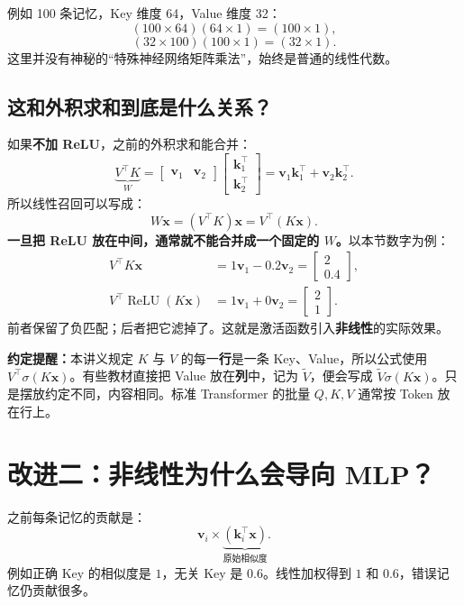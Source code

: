 \documentclass[11pt,a4paper,UTF8]{ctexart}
\numberwithin{equation}{section}
\newcommand{\vect}[1]{\boldsymbol{#1}}
\newcommand{\relu}{\operatorname{ReLU}}
\begin{document}
例如 100 条记忆，Key 维度 64，Value 维度 32：
\[
(100\times64)(64\times1)=(100\times1),
\]
\[
(32\times100)(100\times1)=(32\times1).
\]
这里并没有神秘的“特殊神经网络矩阵乘法”，始终是普通的线性代数。

\subsection{这和外积求和到底是什么关系？}

如果\textbf{不加 ReLU}，之前的外积求和能合并：
\begin{equation}
\underbrace{V^\top K}_{W}
=
\begin{bmatrix}\vect{v}_1&\vect{v}_2\end{bmatrix}
\begin{bmatrix}\vect{k}_1^\top\\\vect{k}_2^\top\end{bmatrix}
=
\vect{v}_1\vect{k}_1^\top+\vect{v}_2\vect{k}_2^\top.
\end{equation}
所以线性召回可以写成：
\[
W\vect{x}=(V^\top K)\vect{x}=V^\top(K\vect{x}).
\]
\textbf{一旦把 ReLU 放在中间，通常就不能合并成一个固定的 $W$。}以本节数字为例：
\begin{align*}
V^\top K\vect{x}
&=1\vect{v}_1-0.2\vect{v}_2
=\begin{bmatrix}2\\0.4\end{bmatrix},\\
V^\top\relu(K\vect{x})
&=1\vect{v}_1+0\vect{v}_2
=\begin{bmatrix}2\\1\end{bmatrix}.
\end{align*}
前者保留了负匹配；后者把它滤掉了。这就是激活函数引入\textbf{非线性}的实际效果。

\begin{warningbox}
\textbf{约定提醒：}本讲义规定 $K$ 与 $V$ 的每一\textbf{行}是一条 Key、Value，所以公式使用 $V^\top\sigma(K\vect{x})$。有些教材直接把 Value 放在\textbf{列}中，记为 $\widetilde V$，便会写成 $\widetilde V\sigma(K\vect{x})$。只是摆放约定不同，内容相同。标准 Transformer 的批量 $Q,K,V$ 通常按 Token 放在行上。
\end{warningbox}

\section{改进二：非线性为什么会导向 MLP？}

之前每条记忆的贡献是：
\[
\vect{v}_i\times\underbrace{(\vect{k}_i^\top\vect{x})}_{\text{原始相似度}}.
\]
例如正确 Key 的相似度是 $1$，无关 Key 是 $0.6$。线性加权得到 $1$ 和 $0.6$，错误记忆仍贡献很多。
\end{document}
